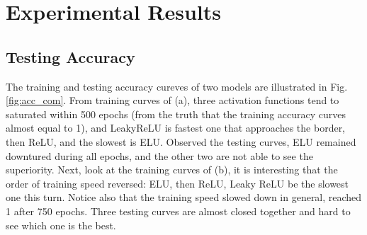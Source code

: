 \documentclass[12pt,a4paper]{article}
\begin{document}
\section{Experimental Results} \label{sec:res}
\subsection{Testing Accuracy}
The training and testing accuracy cureves of two models are illustrated in Fig. \ref{fig:acc_com}. From training curves of (a), three activation functions tend to saturated within 500 epochs (from the truth that the training accuracy curves almost equal to 1), and LeakyReLU is fastest one that approaches the border, then ReLU, and the slowest is ELU. Observed the testing curves, ELU remained downtured during all epochs, and the other two are not able to see the superiority. Next, look at the training curves of (b), it is interesting that the order of training speed reversed: ELU, then ReLU, Leaky ReLU be the slowest one this turn. Notice also that the training speed slowed down in general, reached 1 after 750 epochs. Three testing curves are almost closed together and hard to see which one is the best.
\end{document}
